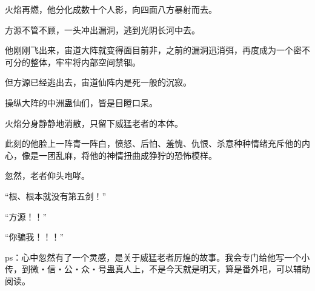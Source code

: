 \begin{this_body}
火焰再燃，他分化成数十个人影，向四面八方暴射而去。

方源不管不顾，一头冲出漏洞，逃到光阴长河中去。

他刚刚飞出来，宙道大阵就变得面目前非，之前的漏洞迅消弭，再度成为一个密不可分的整体，牢牢将内部空间禁锢。

但方源已经逃出去，宙道仙阵内是死一般的沉寂。

操纵大阵的中洲蛊仙们，皆是目瞪口呆。

火焰分身静静地消散，只留下威猛老者的本体。

此刻的他脸上一阵青一阵白，愤怒、后怕、羞愧、仇恨、杀意种种情绪充斥他的内心，像是一团乱麻，将他的神情扭曲成狰狞的恐怖模样。

忽然，老者仰头咆哮。

“根、根本就没有第五剑！”

“方源！！”

“你骗我！！！”

ps：心中忽然有了一个灵感，是关于威猛老者厉煌的故事。我会专门给他写一个小传，到微・信・公・众・号蛊真人上，不是今天就是明天，算是番外吧，可以辅助阅读。

\end{this_body}

